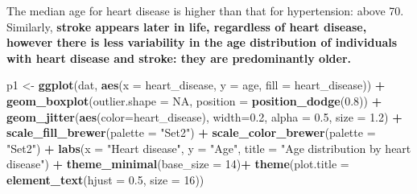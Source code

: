 \documentclass[
]{article}
\newenvironment{Shaded}{\begin{snugshade}}{\end{snugshade}}
\newcommand{\AttributeTok}[1]{\textcolor[rgb]{0.13,0.29,0.53}{#1}}
\newcommand{\ConstantTok}[1]{\textcolor[rgb]{0.56,0.35,0.01}{#1}}
\newcommand{\DecValTok}[1]{\textcolor[rgb]{0.00,0.00,0.81}{#1}}
\newcommand{\FloatTok}[1]{\textcolor[rgb]{0.00,0.00,0.81}{#1}}
\newcommand{\FunctionTok}[1]{\textcolor[rgb]{0.13,0.29,0.53}{\textbf{#1}}}
\newcommand{\NormalTok}[1]{#1}
\newcommand{\OtherTok}[1]{\textcolor[rgb]{0.56,0.35,0.01}{#1}}
\newcommand{\SpecialCharTok}[1]{\textcolor[rgb]{0.81,0.36,0.00}{\textbf{#1}}}
\newcommand{\StringTok}[1]{\textcolor[rgb]{0.31,0.60,0.02}{#1}}
\begin{document}
The median age for heart disease is higher than that for hypertension:
above 70. Similarly, \textbf{stroke appears later in life, regardless of
heart disease, however there is less variability in the age distribution
of individuals with heart disease and stroke: they are predominantly
older.}

\begin{Shaded}
\begin{Highlighting}[]
\NormalTok{p1 }\OtherTok{\textless{}{-}} \FunctionTok{ggplot}\NormalTok{(dat, }\FunctionTok{aes}\NormalTok{(}\AttributeTok{x =}\NormalTok{ heart\_disease, }\AttributeTok{y =}\NormalTok{ age, }\AttributeTok{fill =}\NormalTok{ heart\_disease)) }\SpecialCharTok{+} 
      \FunctionTok{geom\_boxplot}\NormalTok{(}\AttributeTok{outlier.shape =} \ConstantTok{NA}\NormalTok{, }\AttributeTok{position =} \FunctionTok{position\_dodge}\NormalTok{(}\FloatTok{0.8}\NormalTok{)) }\SpecialCharTok{+}
      \FunctionTok{geom\_jitter}\NormalTok{(}\FunctionTok{aes}\NormalTok{(}\AttributeTok{color=}\NormalTok{heart\_disease), }\AttributeTok{width=}\FloatTok{0.2}\NormalTok{, }\AttributeTok{alpha =} \FloatTok{0.5}\NormalTok{, }\AttributeTok{size =} \FloatTok{1.2}\NormalTok{) }\SpecialCharTok{+}
      \FunctionTok{scale\_fill\_brewer}\NormalTok{(}\AttributeTok{palette =} \StringTok{"Set2"}\NormalTok{) }\SpecialCharTok{+}
      \FunctionTok{scale\_color\_brewer}\NormalTok{(}\AttributeTok{palette =} \StringTok{"Set2"}\NormalTok{) }\SpecialCharTok{+}
      \FunctionTok{labs}\NormalTok{(}\AttributeTok{x =} \StringTok{"Heart disease"}\NormalTok{, }\AttributeTok{y =} \StringTok{"Age"}\NormalTok{, }\AttributeTok{title =} \StringTok{"Age distribution by heart disease"}\NormalTok{) }\SpecialCharTok{+}
      \FunctionTok{theme\_minimal}\NormalTok{(}\AttributeTok{base\_size =} \DecValTok{14}\NormalTok{)}\SpecialCharTok{+}
      \FunctionTok{theme}\NormalTok{(}\AttributeTok{plot.title =} \FunctionTok{element\_text}\NormalTok{(}\AttributeTok{hjust =} \FloatTok{0.5}\NormalTok{, }\AttributeTok{size =} \DecValTok{16}\NormalTok{))}



\end{Highlighting}
\end{Shaded}
\end{document}
